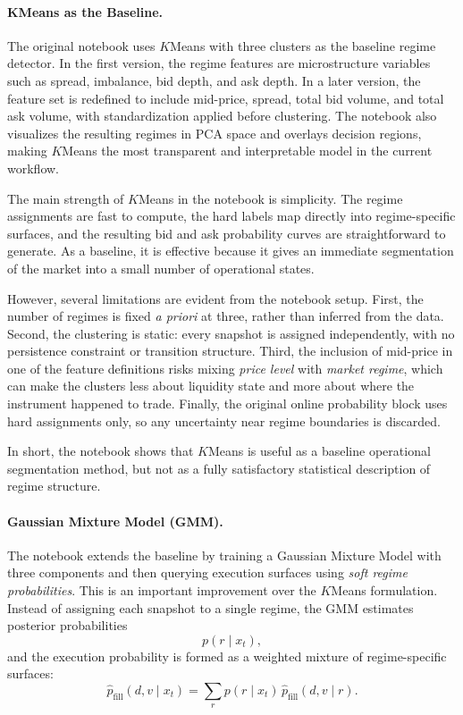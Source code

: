\documentclass[12pt,a4paper]{report}
\begin{document}
\paragraph{KMeans as the Baseline.}
The original notebook uses $K$Means with three clusters as the baseline regime detector. In the first version, the regime features are microstructure variables such as spread, imbalance, bid depth, and ask depth. In a later version, the feature set is redefined to include mid-price, spread, total bid volume, and total ask volume, with standardization applied before clustering. The notebook also visualizes the resulting regimes in PCA space and overlays decision regions, making $K$Means the most transparent and interpretable model in the current workflow.

The main strength of $K$Means in the notebook is simplicity. The regime assignments are fast to compute, the hard labels map directly into regime-specific surfaces, and the resulting bid and ask probability curves are straightforward to generate. As a baseline, it is effective because it gives an immediate segmentation of the market into a small number of operational states.

However, several limitations are evident from the notebook setup. First, the number of regimes is fixed \emph{a priori} at three, rather than inferred from the data. Second, the clustering is static: every snapshot is assigned independently, with no persistence constraint or transition structure. Third, the inclusion of mid-price in one of the feature definitions risks mixing \emph{price level} with \emph{market regime}, which can make the clusters less about liquidity state and more about where the instrument happened to trade. Finally, the original online probability block uses hard assignments only, so any uncertainty near regime boundaries is discarded.

In short, the notebook shows that $K$Means is useful as a baseline operational segmentation method, but not as a fully satisfactory statistical description of regime structure.

\paragraph{Gaussian Mixture Model (GMM).}
The notebook extends the baseline by training a Gaussian Mixture Model with three components and then querying execution surfaces using \emph{soft regime probabilities}. This is an important improvement over the $K$Means formulation. Instead of assigning each snapshot to a single regime, the GMM estimates posterior probabilities
\[
p(r \mid x_t),
\]
and the execution probability is formed as a weighted mixture of regime-specific surfaces:
\[
\hat p_{\text{fill}}(d,v \mid x_t)
=
\sum_r p(r \mid x_t)\,\hat p_{\text{fill}}(d,v \mid r).
\]
\end{document}
